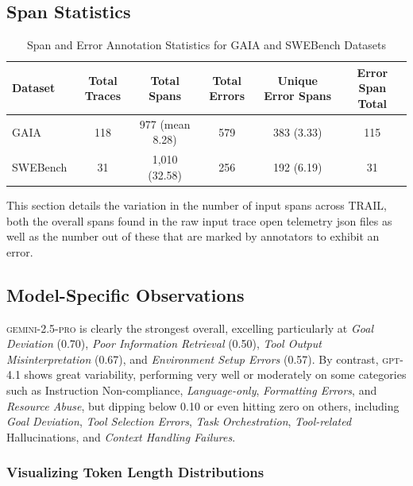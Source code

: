 \documentclass[11pt]{article}
\begin{document}
\subsection{Span Statistics}
\label{appendix_subsec:span_statistics}
\begin{table}[ht]
    \centering
    \caption{Span and Error Annotation Statistics for GAIA and SWEBench Datasets}
    \begin{tabular}{l c c c c c}
    \toprule
    Dataset & Total Traces & Total Spans & Total Errors & Unique Error Spans & Error Span Total \\
    \midrule
    GAIA & 118 & 977 (mean 8.28) & 579 & 383 (3.33) & 115 \\
    SWEBench & 31 & 1,010 (32.58) & 256 & 192 (6.19) & 31 \\
    \bottomrule
    \end{tabular}
    \label{tab:dataset_span_statistics}
\end{table}
This section details the variation in the number of input spans across \textsc{TRAIL}, both the overall spans found in the raw input trace open telemetry json files as well as the number out of these that are marked by annotators to exhibit an error.

\subsection{Model-Specific Observations}
\label{appendix_subsec:model_specific_observations}
\textsc{gemini-2.5-pro} is clearly the strongest overall, excelling particularly at \textit{Goal Deviation} (0.70), \textit{Poor Information Retrieval} (0.50), \textit{Tool Output Misinterpretation} (0.67), and \textit{Environment Setup Errors} (0.57). By contrast, \textsc{gpt-4.1} shows great variability, performing very well or moderately on some categories such as Instruction Non-compliance, \textit{Language-only}, \textit{Formatting Errors}, and \textit{Resource Abuse}, but dipping below 0.10 or even hitting zero on others, including \textit{Goal Deviation}, \textit{Tool Selection Errors}, \textit{Task Orchestration}, \textit{Tool-related} Hallucinations, and \textit{Context Handling Failures}.
\subsubsection{Visualizing Token Length Distributions}
\label{appendix_subsubsec:viztoklen}
\end{document}
